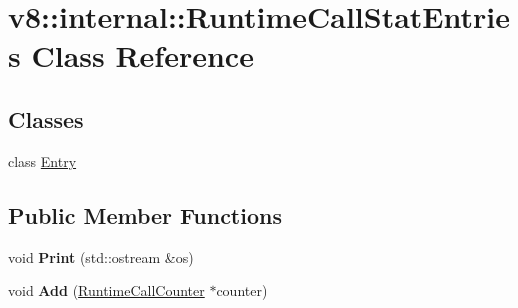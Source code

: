 \hypertarget{classv8_1_1internal_1_1_runtime_call_stat_entries}{}\section{v8\+:\+:internal\+:\+:Runtime\+Call\+Stat\+Entries Class Reference}
\label{classv8_1_1internal_1_1_runtime_call_stat_entries}
\subsection*{Classes}
\begin{DoxyCompactItemize}
\item 
class \hyperlink{classv8_1_1internal_1_1_runtime_call_stat_entries_1_1_entry}{Entry}
\end{DoxyCompactItemize}
\subsection*{Public Member Functions}
\begin{DoxyCompactItemize}
\item 
void {\bfseries Print} (std\+::ostream \&os)\hypertarget{classv8_1_1internal_1_1_runtime_call_stat_entries_a83b50921e62d21aaeab9b78b8a623843}{}\label{classv8_1_1internal_1_1_runtime_call_stat_entries_a83b50921e62d21aaeab9b78b8a623843}

\item 
void {\bfseries Add} (\hyperlink{structv8_1_1internal_1_1_runtime_call_counter}{Runtime\+Call\+Counter} $\ast$counter)\hypertarget{classv8_1_1internal_1_1_runtime_call_stat_entries_a86770b512efc3e864b5a14251deb82d3}{}\label{classv8_1_1internal_1_1_runtime_call_stat_entries_a86770b512efc3e864b5a14251deb82d3}

\end{DoxyCompactItemize}
